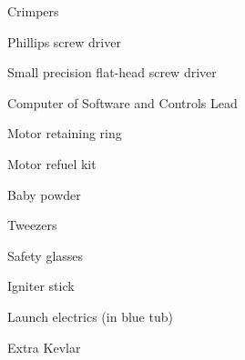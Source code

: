\begin{multicols}{2}
\begin{todolist}
			\item Crimpers
			\item Phillips screw driver
			\item Small precision flat-head screw driver
			\item Computer of Software and Controls Lead
			\item Motor retaining ring
			\item Motor refuel kit
			\item Baby powder
			\item Tweezers
			\item Safety glasses
			\item Igniter stick
			\item Launch electrics (in blue tub)
			\item Extra Kevlar
		\end{todolist}
	\end{multicols}
	

